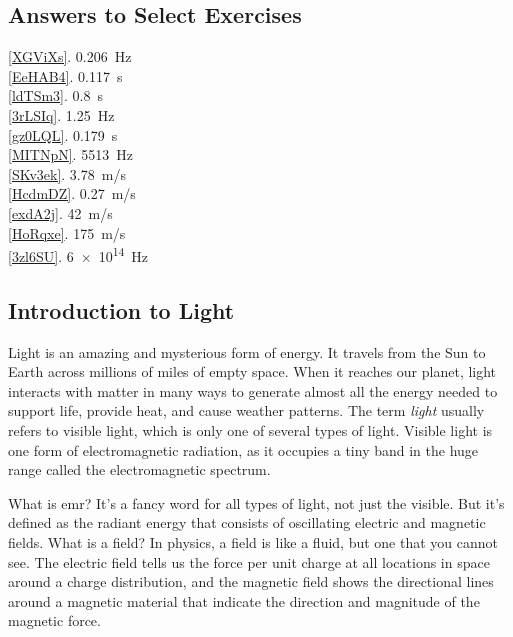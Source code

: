 \documentclass[main.tex]{subfiles}
\begin{document}
\clearpage
\printnoidxglossaries




\clearpage

\subsection*{Answers to Select Exercises}


\ref{XGViXs}. \SI{0.206}{Hz}\\
\ref{EeHAB4}. \SI{0.117}{s}\\
\ref{ldTSm3}. \SI{0.8}{s}\\
\ref{3rLSIq}. \SI{1.25}{Hz}\\
\ref{gz0LQL}. \SI{0.179}{s}\\
\ref{MITNpN}. \SI{5513}{Hz}\\
\ref{SKv3ek}. \SI{3.78}{m/s}\\
\ref{HcdmDZ}. \SI{0.27}{m/s}\\
\ref{exdA2j}. \SI{42}{m/s}\\
\ref{HoRqxe}. \SI{175}{m/s}\\
\ref{3zl6SU}. \SI{6e14}{Hz}\\

\clearpage

\subsection{Introduction to Light} \label{SJFjXy}

Light is an amazing and mysterious form of energy. It travels from the Sun to Earth across millions of miles of empty space. When it reaches our planet, light interacts with matter in many ways to generate almost all the energy needed to support life, provide heat, and cause weather patterns. The term \textit{light} usually refers to visible light, which is only one of several types of light. Visible light is one form of electromagnetic radiation, as it occupies a tiny band in the huge range called the electromagnetic spectrum.

\vspace{1em}


What is \gls{emr}? It's a fancy word for all types of light, not just the visible. But it's defined as the radiant energy that consists of oscillating electric and magnetic fields. What is a field? In physics, a field is like a fluid, but one that you cannot see. The \gls{electric field} tells us the force per unit charge at all locations in space around a charge distribution, and the \gls{magnetic field} shows the directional lines around a magnetic material that indicate the direction and magnitude of the magnetic force. 
\end{document}
